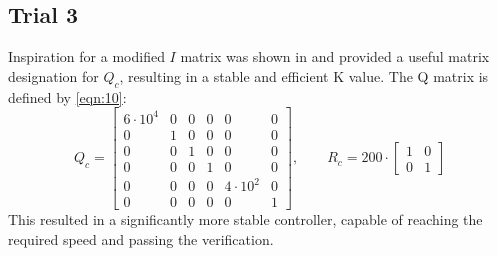\documentclass[12pt]{article}
\begin{document}
\subsection{Trial 3} \label{sec:4.3}
Inspiration for a modified $I$ matrix was shown in \cite{Bonafilia} and provided a useful matrix designation for $Q_c$, resulting in a stable and efficient K value.  The Q matrix is defined by \ref{eqn:10}:
\begin{equation} \label{eqn:10}
    Q_c = 
    \begin{bmatrix}
        6\cdot 10^4 & 0 & 0 & 0 & 0 & 0 \\
        0 & 1 & 0 & 0 & 0 & 0 \\
        0 & 0 & 1 & 0 & 0 & 0 \\
        0 & 0 & 0 & 1 & 0 & 0 \\
        0 & 0 & 0 & 0 & 4\cdot 10^2 & 0 \\
        0 & 0 & 0 & 0 & 0 & 1
    \end{bmatrix}, \qquad R_c = 200\cdot \begin{bmatrix} 1 & 0 \\ 0 & 1 \end{bmatrix}
\end{equation}
This resulted in a significantly more stable controller, capable of reaching the required speed and passing the verification.  






\end{document}
